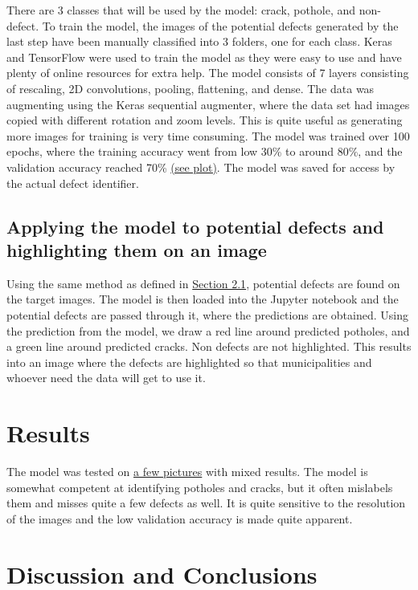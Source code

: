 \documentclass[12pt, letterpaper, twoside]{article}
\begin{document}
There are 3 classes that will be used by the model: crack, pothole, and non-defect. 
To train the model, the images of the potential defects generated by the last step have been manually classified into 3 folders, one for each class.
Keras and TensorFlow were used to train the model as they were easy to use and have plenty of online resources for extra help.
The model consists of 7 layers consisting of rescaling, 2D convolutions, pooling, flattening, and dense.
The data was augmenting using the Keras sequential augmenter, where the data set had images copied with different rotation and zoom levels.
This is quite useful as generating more images for training is very time consuming.
The model was trained over 100 epochs, where the training accuracy went from low 30\% to around 80\%,
and the validation accuracy reached 70\% \hyperref[app:model_plot]{(see plot)}.
The model was saved for access by the actual defect identifier.

\subsection{Applying the model to potential defects and highlighting them on an image}

Using the same method as defined in \hyperref[sec:meth:1]{Section 2.1}, potential defects are found on the target images.
The model is then loaded into the Jupyter notebook and the potential defects are passed through it, where the predictions are obtained.
Using the prediction from the model, we draw a red line around predicted potholes, and a green line around predicted cracks.
Non defects are not highlighted.
This results into an image where the defects are highlighted so that municipalities and whoever need the data will get to use it.

\section{Results}
\label{sec:resu}

The model was tested on \hyperref[app:result_image]{a few pictures} with mixed results. 
The model is somewhat competent at identifying potholes and cracks, but it often mislabels them and misses quite a few defects as well.
It is quite sensitive to the resolution of the images and the low validation accuracy is made quite apparent.

\section{Discussion and Conclusions}
\label{sec:conc}
\end{document}
